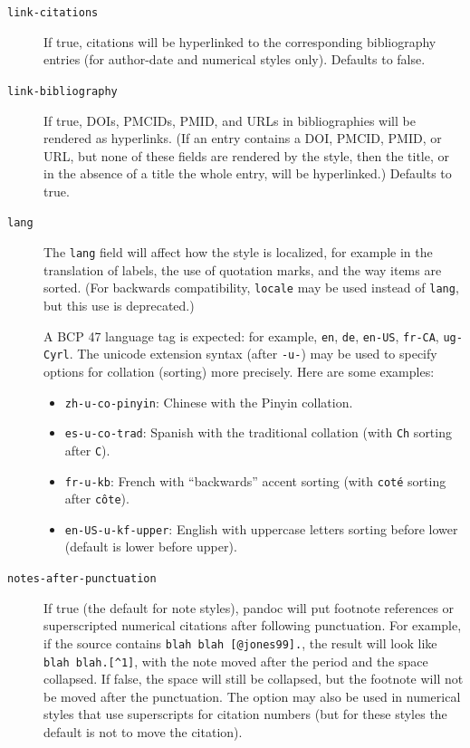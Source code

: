 \documentclass[
  b5paper
]{book}
\providecommand{\tightlist}{%
  \setlength{\itemsep}{0pt}\setlength{\parskip}{0pt}}
\begin{document}
\begin{description}
\item[\texttt{link-citations}]
If true, citations will be hyperlinked to the corresponding bibliography
entries (for author-date and numerical styles only). Defaults to false.
\item[\texttt{link-bibliography}]
If true, DOIs, PMCIDs, PMID, and URLs in bibliographies will be rendered
as hyperlinks. (If an entry contains a DOI, PMCID, PMID, or URL, but
none of these fields are rendered by the style, then the title, or in
the absence of a title the whole entry, will be hyperlinked.) Defaults
to true.
\item[\texttt{lang}]
The \texttt{lang} field will affect how the style is localized, for
example in the translation of labels, the use of quotation marks, and
the way items are sorted. (For backwards compatibility, \texttt{locale}
may be used instead of \texttt{lang}, but this use is deprecated.)

A BCP 47 language tag is expected: for example, \texttt{en},
\texttt{de}, \texttt{en-US}, \texttt{fr-CA}, \texttt{ug-Cyrl}. The
unicode extension syntax (after \texttt{-u-}) may be used to specify
options for collation (sorting) more precisely. Here are some examples:

\begin{itemize}
\tightlist
\item
  \texttt{zh-u-co-pinyin}: Chinese with the Pinyin collation.
\item
  \texttt{es-u-co-trad}: Spanish with the traditional collation (with
  \texttt{Ch} sorting after \texttt{C}).
\item
  \texttt{fr-u-kb}: French with ``backwards'' accent sorting (with
  \texttt{coté} sorting after \texttt{côte}).
\item
  \texttt{en-US-u-kf-upper}: English with uppercase letters sorting
  before lower (default is lower before upper).
\end{itemize}
\item[\texttt{notes-after-punctuation}]
If true (the default for note styles), pandoc will put footnote
references or superscripted numerical citations after following
punctuation. For example, if the source contains
\texttt{blah\ blah\ {[}@jones99{]}.}, the result will look like
\texttt{blah\ blah.{[}\^{}1{]}}, with the note moved after the period
and the space collapsed. If false, the space will still be collapsed,
but the footnote will not be moved after the punctuation. The option may
also be used in numerical styles that use superscripts for citation
numbers (but for these styles the default is not to move the citation).
\end{description}
\end{document}
